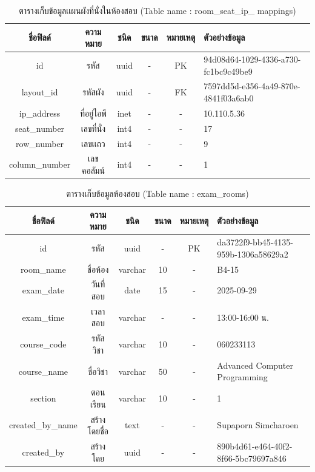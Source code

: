 \begin{table}[h!]
    \centering
    \caption{\fontSixTeen ตารางเก็บข้อมูลเเผนผังที่นั่งในห้องสอบ (Table name : room\_seat\_ip\_ mappings)}
    \label{tab3:roomseatipmappings}
    \fontSixTeen 
    \begin{tabularx}{\textwidth}{| c | c | c | c | c | X |} 
    \hline
    \textbf{ชื่อฟิลด์} & \textbf{ความหมาย} & \textbf{ชนิด} & \textbf{ขนาด} & \textbf{หมายเหตุ} & \textbf{ตัวอย่างข้อมูล} \\
    \hline
    id & รหัส & uuid & - & PK & 94d08d64-1029-4336-a730-fc1bc9c49be9 \\
    \hline
    layout\_id & รหัสผัง & uuid & - & FK & 7597dd5d-e356-4a49-870e-4841f03a6ab0 \\
    \hline
    ip\_address & ที่อยู่ไอพี & inet & - & - & 10.110.5.36 \\
    \hline
    seat\_number & เลขที่นั่ง & int4 & - & - & 17 \\
    \hline
    row\_number & เลขเเถว & int4 & - & - & 9 \\
    \hline
    column\_number & เลขคอลัมน์ & int4 & - & - & 1 \\
    \hline
    \end{tabularx}
\end{table}

\begin{table}[h!]
    \centering
    \caption{\fontSixTeen ตารางเก็บข้อมูลห้องสอบ (Table name : exam\_rooms)} 
    \label{tab3:examrooms}
    \fontSixTeen
    \begin{tabularx}{\textwidth}{| c | c | c | c | c | X |}    
        \hline
        \textbf{ชื่อฟิลด์} & \textbf{ความหมาย} & \textbf{ชนิด} & \textbf{ขนาด} & \textbf{หมายเหตุ} & \textbf{ตัวอย่างข้อมูล} \\
        \hline
        id & รหัส & uuid & - & PK & da3722f9-bb45-4135-959b-1306a58629a2 \\
        \hline
        room\_name & ชื่อห้อง & varchar & 10 & - & B4-15 \\
        \hline
        exam\_date & วันที่สอบ & date & 15 & - & 2025-09-29 \\
        \hline
        exam\_time & เวลาสอบ & varchar & - & - & 13:00-16:00 น. \\
        \hline
        course\_code & รหัสวิชา & varchar & 10 & - & 060233113 \\
        \hline
        course\_name & ชื่อวิชา & varchar & 50 & - & Advanced Computer Programming \\
        \hline
        section & ตอนเรียน & varchar & 10 & - & 1 \\
        \hline
        created\_by\_name & สร้างโดยชื่อ & text & - & - & Supaporn Simcharoen \\
        \hline
        created\_by & สร้างโดย & uuid & - & - & 890b4d61-e464-40f2-8f66-5bc79697a846 \\
        \hline
    \end{tabularx}
\end{table}

